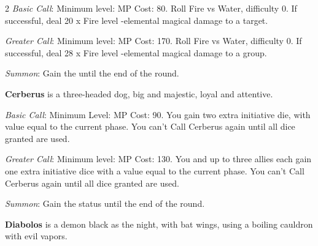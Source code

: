 \begin{multicols}{2}
    \textit{Basic Call}: Minimum level:  MP Cost: 80. Roll Fire vs Water, difficulty 0. If successful, deal 20 x Fire level -elemental magical damage to a target.
    
    \textit{Greater Call}: Minimum level:  MP Cost: 170. Roll Fire vs Water, difficulty 0. If successful, deal 28 x Fire level -elemental magical damage to a group.
    
    \textit{Summon}: Gain the  until the end of the round.

    \ffcrystal[type=level,height=8pt]
    
    \textbf{Cerberus} is a three-headed dog, big and majestic, loyal and attentive.
    
    \textit{Basic Call}: Minimum Level:  MP Cost: 90. You gain two extra initiative die, with value equal to the current phase. You can't Call Cerberus again until all dice granted are used.
    
    \textit{Greater Call}: Minimum level:  MP Cost: 130. You and up to three allies each gain one extra initiative dice with a value equal to the current phase. You can't Call Cerberus again until all dice granted are used.
    
    \textit{Summon}: Gain the  status until the end of the round.

    \ffcrystal[type=level,height=8pt]
    
    \textbf{Diabolos} is a demon black as the night, with bat wings, using a boiling cauldron with evil vapors.
    

\end{multicols}
